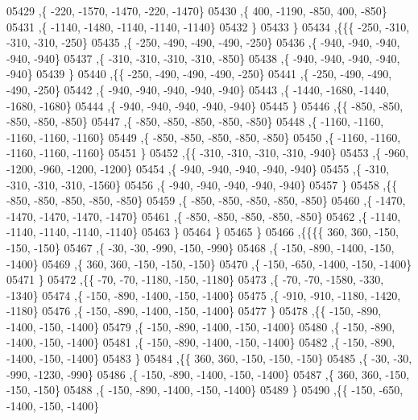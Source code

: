 \begin{DoxyCode}
05429     ,\{  -220, -1570, -1470,  -220, -1470\}
05430     ,\{   400, -1190,  -850,   400,  -850\}
05431     ,\{ -1140, -1480, -1140, -1140, -1140\}
05432     \}
05433    \}
05434   ,\{\{\{  -250,  -310,  -310,  -310,  -250\}
05435     ,\{  -250,  -490,  -490,  -490,  -250\}
05436     ,\{  -940,  -940,  -940,  -940,  -940\}
05437     ,\{  -310,  -310,  -310,  -310,  -850\}
05438     ,\{  -940,  -940,  -940,  -940,  -940\}
05439     \}
05440    ,\{\{  -250,  -490,  -490,  -490,  -250\}
05441     ,\{  -250,  -490,  -490,  -490,  -250\}
05442     ,\{  -940,  -940,  -940,  -940,  -940\}
05443     ,\{ -1440, -1680, -1440, -1680, -1680\}
05444     ,\{  -940,  -940,  -940,  -940,  -940\}
05445     \}
05446    ,\{\{  -850,  -850,  -850,  -850,  -850\}
05447     ,\{  -850,  -850,  -850,  -850,  -850\}
05448     ,\{ -1160, -1160, -1160, -1160, -1160\}
05449     ,\{  -850,  -850,  -850,  -850,  -850\}
05450     ,\{ -1160, -1160, -1160, -1160, -1160\}
05451     \}
05452    ,\{\{  -310,  -310,  -310,  -310,  -940\}
05453     ,\{  -960, -1200,  -960, -1200, -1200\}
05454     ,\{  -940,  -940,  -940,  -940,  -940\}
05455     ,\{  -310,  -310,  -310,  -310, -1560\}
05456     ,\{  -940,  -940,  -940,  -940,  -940\}
05457     \}
05458    ,\{\{  -850,  -850,  -850,  -850,  -850\}
05459     ,\{  -850,  -850,  -850,  -850,  -850\}
05460     ,\{ -1470, -1470, -1470, -1470, -1470\}
05461     ,\{  -850,  -850,  -850,  -850,  -850\}
05462     ,\{ -1140, -1140, -1140, -1140, -1140\}
05463     \}
05464    \}
05465   \}
05466  ,\{\{\{\{   360,   360,  -150,  -150,  -150\}
05467     ,\{   -30,   -30,  -990,  -150,  -990\}
05468     ,\{  -150,  -890, -1400,  -150, -1400\}
05469     ,\{   360,   360,  -150,  -150,  -150\}
05470     ,\{  -150,  -650, -1400,  -150, -1400\}
05471     \}
05472    ,\{\{   -70,   -70, -1180,  -150, -1180\}
05473     ,\{   -70,   -70, -1580,  -330, -1340\}
05474     ,\{  -150,  -890, -1400,  -150, -1400\}
05475     ,\{  -910,  -910, -1180, -1420, -1180\}
05476     ,\{  -150,  -890, -1400,  -150, -1400\}
05477     \}
05478    ,\{\{  -150,  -890, -1400,  -150, -1400\}
05479     ,\{  -150,  -890, -1400,  -150, -1400\}
05480     ,\{  -150,  -890, -1400,  -150, -1400\}
05481     ,\{  -150,  -890, -1400,  -150, -1400\}
05482     ,\{  -150,  -890, -1400,  -150, -1400\}
05483     \}
05484    ,\{\{   360,   360,  -150,  -150,  -150\}
05485     ,\{   -30,   -30,  -990, -1230,  -990\}
05486     ,\{  -150,  -890, -1400,  -150, -1400\}
05487     ,\{   360,   360,  -150,  -150,  -150\}
05488     ,\{  -150,  -890, -1400,  -150, -1400\}
05489     \}
05490    ,\{\{  -150,  -650, -1400,  -150, -1400\}

\end{DoxyCode}
